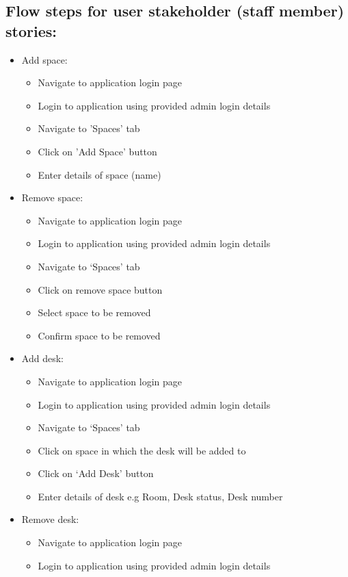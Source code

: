 \documentclass[11pt,a4paper]{article}
\begin{document}
\subsection{Flow steps for user stakeholder (staff member) stories:}
\begin{itemize}
  \item Add space:
    \begin{itemize}
      \item Navigate to application login page
      \item Login to application using provided admin login details
      \item Navigate to 'Spaces' tab
      \item Click on 'Add Space' button
      \item Enter details of space (name)
    \end{itemize}
  \item Remove space:
    \begin{itemize}
      \item Navigate to application login page
      \item Login to application using provided admin login details
      \item Navigate to ‘Spaces’ tab
      \item Click on remove space button
      \item Select space to be removed
      \item Confirm space to be removed
    \end{itemize}
  \item Add desk:
    \begin{itemize}
      \item Navigate to application login page
      \item Login to application using provided admin login details
      \item Navigate to ‘Spaces’ tab
      \item Click on space in which the desk will be added to
      \item Click on ‘Add Desk’ button
      \item Enter details of desk e.g Room, Desk status, Desk number
    \end{itemize}
  \item Remove desk:
    \begin{itemize}
      \item Navigate to application login page
      \item Login to application using provided admin login details

\end{itemize}
\end{itemize}
\end{document}
